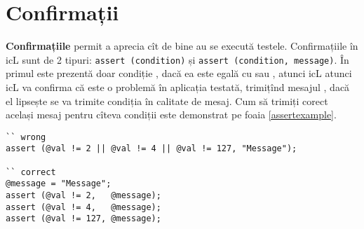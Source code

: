 \section{Confirmații}

{\bf Confirmațiile} permit a aprecia cît de bine au se execută testele. Confirmațiile în icL sunt de 2 tipuri: \lstinline|assert (condition)| și \lstinline|assert (condition, message)|. În primul este prezentă doar condiție , dacă ea este egală cu \false{} sau \void, atunci icL atunci icL va confirma că este o problemă în aplicația testată, trimițînd mesajul , dacă el lipsește se va trimite condiția în calitate de mesaj. Cum să trimiți corect același mesaj pentru cîteva condiții este demonstrat pe foaia \ref{assertexample}.

\begin{lstlisting}[caption=Exemple de folosire a confirmațiilor, label=assertexample]
`` wrong
assert (@val != 2 || @val != 4 || @val != 127, "Message");

`` correct
@message = "Message";
assert (@val != 2,   @message);
assert (@val != 4,   @message);
assert (@val != 127, @message);
\end{lstlisting}
